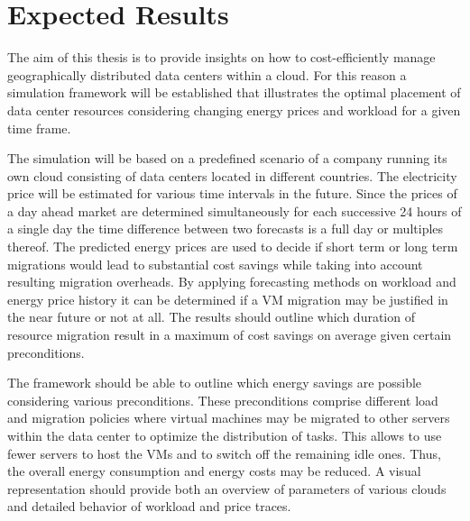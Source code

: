 \documentclass[a4paper]{article}
\begin{document}



\section{Expected Results}

The aim of this thesis is to provide insights on how to cost-efficiently manage geographically distributed data centers within a cloud. For this reason a simulation framework will be established that illustrates the optimal placement of data center resources considering changing energy prices and workload for a given time frame. 

The simulation will be based on a predefined scenario of a company running its own cloud consisting of data centers located in different countries. The electricity price will be estimated for various time intervals in the future. Since the prices of a day ahead market are determined simultaneously for each successive 24 hours of a single day the time difference between two forecasts is a full day or multiples thereof. The predicted energy prices are used to decide if short term or long term migrations would lead to substantial cost savings while taking into account resulting migration overheads. 
By applying forecasting methods on workload and energy price history it can be determined if a VM migration may be justified in the near future or not at all. 
The results should outline which duration of resource migration result in a maximum of cost savings on average given certain preconditions. 

The framework should be able to outline which energy savings are possible considering various preconditions. 
These preconditions comprise different load and migration policies where virtual machines may be migrated to other servers within the data center to optimize the distribution of tasks. This allows to use fewer servers to host the VMs and to switch off the remaining idle ones. Thus, the overall energy consumption and energy costs may be reduced. 
A visual representation should provide both an overview of parameters of various clouds and detailed behavior of workload and price traces. 
\end{document}
